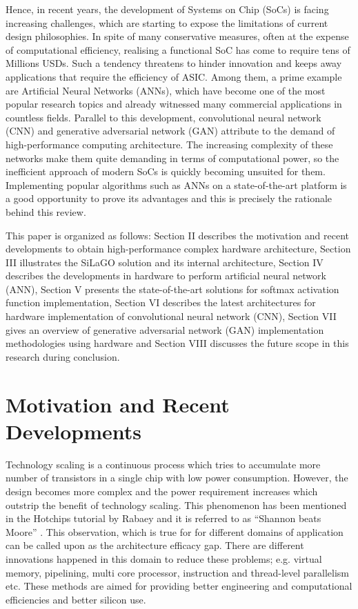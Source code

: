 \documentclass[journal]{IEEEtran}
\begin{document}
\par Hence, in recent years, the development of Systems on Chip (SoCs) is facing increasing challenges, which are starting to expose the limitations of current design philosophies. In spite of many conservative measures, often at the expense of computational efficiency, realising a functional SoC has come to require tens of Millions USDs. Such a tendency threatens to hinder innovation and keeps away applications that require the efficiency of ASIC. Among them, a prime example are Artificial Neural Networks (ANNs), which have become one of the most popular research topics and already witnessed many commercial applications in countless fields. Parallel to this development, convolutional neural network (CNN) and generative adversarial network (GAN) attribute to the demand of high-performance computing architecture. The increasing complexity of these networks make them quite demanding in terms of computational power, so the inefficient approach of modern SoCs is quickly becoming unsuited for them. Implementing popular algorithms such as ANNs on a state-of-the-art platform is a good opportunity to prove its advantages and this is precisely the rationale behind this review.

\par This paper is organized as follows: Section II describes the motivation and recent developments to obtain high-performance complex hardware architecture, Section III illustrates the SiLaGO solution and its internal architecture, Section IV describes the developments in hardware to perform artificial neural network (ANN), Section V presents the state-of-the-art solutions for softmax activation function implementation, Section VI describes the latest architectures for hardware implementation of convolutional neural network (CNN), Section VII gives an overview of generative adversarial network (GAN) implementation methodologies using hardware and Section VIII discusses the future scope in this research during conclusion. 

\section{Motivation and Recent Developments}
Technology scaling is a continuous process which tries to accumulate more number of transistors in a single chip with low power consumption. However, the design becomes more complex and the power requirement increases which outstrip the benefit of technology scaling. This phenomenon has been mentioned in the Hotchips tutorial by Rabaey and it is referred to as ``Shannon beats Moore'' \cite{paper1}. This observation, which is true for for different domains of application can be called upon as the architecture efficacy gap. There are different innovations happened in this domain to reduce these problems; e.g. virtual memory, pipelining, multi core processor, instruction and thread-level parallelism etc. These methods are aimed for providing better engineering and computational efficiencies and better silicon use. 
\end{document}

